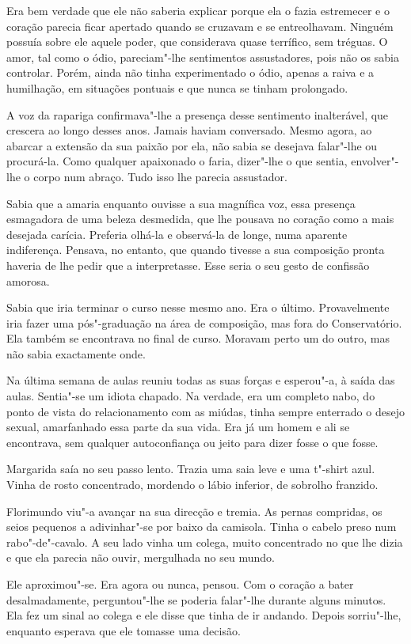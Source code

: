 Era bem verdade que ele não saberia explicar porque ela o fazia
estremecer e o coração parecia ficar apertado quando se cruzavam e se
entreolhavam. Ninguém possuía sobre ele aquele poder, que considerava
quase terrífico, sem tréguas. O amor, tal como o ódio, pareciam"-lhe
sentimentos assustadores, pois não os sabia controlar. Porém, ainda não
tinha experimentado o ódio, apenas a raiva e a humilhação, em situações
pontuais e que nunca se tinham prolongado.

A voz da rapariga confirmava"-lhe a presença desse sentimento
inalterável, que crescera ao longo desses anos. Jamais haviam
conversado. Mesmo agora, ao abarcar a extensão da sua paixão por ela,
não sabia se desejava falar"-lhe ou procurá-la. Como qualquer apaixonado
o faria, dizer"-lhe o que sentia, envolver"-lhe o corpo num abraço. Tudo
isso lhe parecia assustador.

Sabia que a amaria enquanto ouvisse a sua magnífica voz, essa presença
esmagadora de uma beleza desmedida, que lhe pousava no coração como a
mais desejada carícia. Preferia olhá-la e observá-la de longe, numa
aparente indiferença. Pensava, no entanto, que quando tivesse a sua
composição pronta haveria de lhe pedir que a interpretasse. Esse seria o
seu gesto de confissão amorosa.

Sabia que iria terminar o curso nesse mesmo ano. Era o último.
Provavelmente iria fazer uma pós"-graduação na área de composição, mas
fora do Conservatório. Ela também se encontrava no final de curso.
Moravam perto um do outro, mas não sabia exactamente onde.

Na última semana de aulas reuniu todas as suas forças e esperou"-a, à
saída das aulas. Sentia"-se um idiota chapado. Na verdade, era um
completo nabo, do ponto de vista do relacionamento com as miúdas, tinha
sempre enterrado o desejo sexual, amarfanhado essa parte da sua vida.
Era já um homem e ali se encontrava, sem qualquer autoconfiança ou
jeito para dizer fosse o que fosse.

Margarida saía no seu passo lento. Trazia uma saia leve e uma t"-shirt
azul. Vinha de rosto concentrado, mordendo o lábio inferior, de sobrolho
franzido.

Florimundo viu"-a avançar na sua direcção e tremia. As pernas compridas,
os seios pequenos a adivinhar"-se por baixo da camisola. Tinha o cabelo
preso num rabo"-de"-cavalo. A seu lado vinha um colega, muito concentrado
no que lhe dizia e que ela parecia não ouvir, mergulhada no seu mundo.

Ele aproximou"-se. Era agora ou nunca, pensou. Com o coração a bater
desalmadamente, perguntou"-lhe se poderia falar"-lhe durante alguns
minutos. Ela fez um sinal ao colega e ele disse que tinha de ir andando.
Depois sorriu"-lhe, enquanto esperava que ele tomasse uma decisão.

